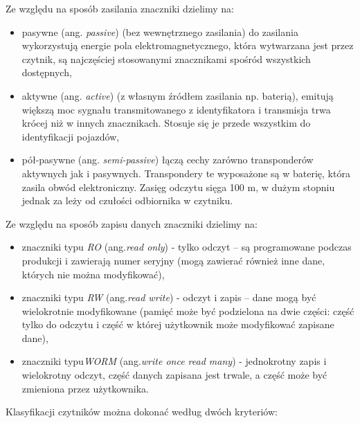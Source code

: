 \noindent 
Ze względu na sposób zasilania znaczniki dzielimy na: 
\begin{itemize}\setlength{\itemsep}{0pt}

	\item pasywne  (ang. \emph{passive}) (bez wewnętrznego zasilania) do zasilania  wykorzystują energie pola elektromagnetycznego, która wytwarzana jest przez czytnik, są najczęściej stosowanymi znacznikami spośród wszystkich dostępnych, 

	\item aktywne (ang. \emph{active}) (z własnym źródłem zasilania np. baterią), emitują większą moc sygnału transmitowanego z identyfikatora i transmisja trwa krócej niż w innych znacznikach. Stosuje się je przede wszystkim do identyfikacji pojazdów,
	
	\item pół-pasywne (ang. \emph{semi-passive}) łączą cechy zarówno transponderów aktywnych jak i pasywnych. Transpondery te wyposażone są w baterię, która zasila obwód elektroniczny. Zasięg odczytu sięga 100 m, w dużym stopniu jednak za leży od czułości odbiornika w czytniku.  

\end{itemize}

\noindent 
\newline Ze względu na sposób zapisu danych znaczniki dzielimy na:
\begin{itemize}\setlength{\itemsep}{0pt}

	\item znaczniki typu \emph{RO} (ang.\emph{read only}) - tylko odczyt – są programowane podczas produkcji i zawierają numer seryjny (mogą zawierać również inne dane, których nie można modyfikować), 

	\item znaczniki typu \emph{RW} (ang.\emph{read write}) - odczyt i zapis – dane mogą być wielokrotnie modyfikowane (pamięć może być podzielona na dwie części: część tylko do odczytu i część w której użytkownik może modyfikować zapisane dane),

	\item znaczniki typu\emph{WORM} (ang.\emph{write once read many}) - jednokrotny zapis i wielokrotny odczyt, część danych zapisana jest trwale, a część może być zmieniona przez użytkownika.

\end{itemize}


\noindent 
\newline Klasyfikacji czytników można dokonać według dwóch kryteriów:


